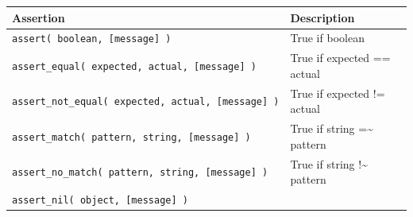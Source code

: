 \documentclass[]{book}
\begin{document}
\begin{longtable}[]{@{}ll@{}}
\toprule
\begin{minipage}[b]{0.43\columnwidth}\raggedright
Assertion\strut
\end{minipage} & \begin{minipage}[b]{0.51\columnwidth}\raggedright
Description\strut
\end{minipage}\tabularnewline
\midrule
\endhead
\begin{minipage}[t]{0.43\columnwidth}\raggedright
\texttt{assert(\ boolean,\ {[}message{]}\ )}\strut
\end{minipage} & \begin{minipage}[t]{0.51\columnwidth}\raggedright
True if boolean\strut
\end{minipage}\tabularnewline
\begin{minipage}[t]{0.43\columnwidth}\raggedright
\texttt{assert\_equal(\ expected,\ actual,\ {[}message{]}\ )}\strut
\end{minipage} & \begin{minipage}[t]{0.51\columnwidth}\raggedright
True if expected == actual\strut
\end{minipage}\tabularnewline
\begin{minipage}[t]{0.43\columnwidth}\raggedright
\texttt{assert\_not\_equal(\ expected,\ actual,\ {[}message{]}\ )}\strut
\end{minipage} & \begin{minipage}[t]{0.51\columnwidth}\raggedright
True if expected != actual\strut
\end{minipage}\tabularnewline
\begin{minipage}[t]{0.43\columnwidth}\raggedright
\texttt{assert\_match(\ pattern,\ string,\ {[}message{]}\ )}\strut
\end{minipage} & \begin{minipage}[t]{0.51\columnwidth}\raggedright
True if string =\textasciitilde{} pattern\strut
\end{minipage}\tabularnewline
\begin{minipage}[t]{0.43\columnwidth}\raggedright
\texttt{assert\_no\_match(\ pattern,\ string,\ {[}message{]}\ )}\strut
\end{minipage} & \begin{minipage}[t]{0.51\columnwidth}\raggedright
True if string !\textasciitilde{} pattern\strut
\end{minipage}\tabularnewline
\begin{minipage}[t]{0.43\columnwidth}\raggedright
\texttt{assert\_nil(\ object,\ {[}message{]}\ )}\strut

\end{minipage}
\end{longtable}
\end{document}
